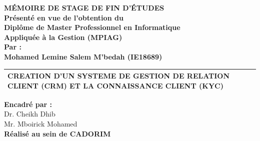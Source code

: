 \documentclass[a4paper, 12pt]{report}
\begin{document}
\begin{titlepage}
\begin{center}
			\bf{MÉMOIRE DE STAGE DE FIN D'ÉTUDES} \\
			\vspace{1cm}
			{\bf Présenté en vue de l’obtention du } \vspace{-0.2cm}\\
			{\bf Diplôme de Master Professionnel en Informatique}\vspace{-0.2cm}\\
				{\bf	Appliquée à la Gestion (MPIAG)}\\ \vspace{0.2cm}
				{\bf Par :}\\ \vspace{0.2cm}
					{\bf Mohamed Lemine Salem M’bedah (IE18689) }\\ \vspace{1cm}
	\setlength\arrayrulewidth{3pt}
	\begin{tabularx}{1\textwidth} { 
			| >{\raggedright\arraybackslash}X 
			|  }
		\hline
		 \vspace{0.1cm}
		 \Large{\bf{\hspace*{0.4cm}CREATION D’UN SYSTEME DE GESTION DE \hspace*{2.2cm} RELATION CLIENT (CRM) ET LA \hspace*{2.5cm} CONNAISSANCE CLIENT (KYC)}}
		 \vspace{0.3cm}
		 \\
		\hline
	\end{tabularx}
			
			

		\end{center}
		\vspace{0cm}
		\begin{center}
			
			{\bf Encadré par :}\\
			{Dr. Cheikh Dhib} \\
			{\hspace{1.4cm}Mr. Mboirick Mohamed} \\
			{\bf 
				Réalisé au sein de CADORIM }
			

\end{center}
\end{titlepage}
\end{document}
